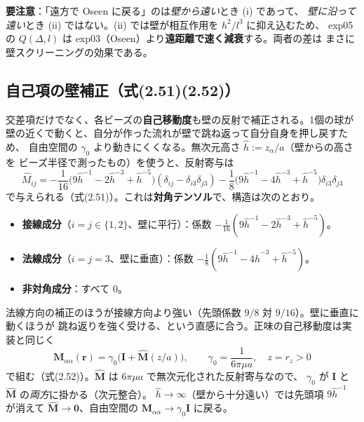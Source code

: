 \documentclass[11pt,a4paper]{article}
\newcommand{\rv}{\bm{r}}
\newcommand{\gamz}{\gamma_{0}}
\begin{document}
\begin{warnbox}
\textbf{要注意}：「遠方で Oseen に戻る」のは\emph{壁から遠い}とき (i) であって、
\emph{壁に沿って遠い}とき (ii) ではない。(ii) では壁が相互作用を $h^2/l^3$ に抑え込むため、
exp05 の $Q(\Delta,l)$ は exp03（Oseen）より\textbf{遠距離で速く減衰}する。両者の差は
まさに壁スクリーニングの効果である。
\end{warnbox}

\subsection{自己項の壁補正（式(2.51)(2.52)）}\label{sec:blakeself}

交差項だけでなく、各ビーズの\textbf{自己移動度}も壁の反射で補正される。1個の球が
壁の近くで動くと、自分が作った流れが壁で跳ね返って自分自身を押し戻すため、
自由空間の $\gamz$ より動きにくくなる。無次元高さ $\hat h:=z_\alpha/a$（壁からの高さを
ビーズ半径で測ったもの）を使うと、反射寄与は
\begin{equation}
\widehat M_{ij}=-\frac{1}{16}\big(9\hat h^{-1}-2\hat h^{-3}+\hat h^{-5}\big)
(\delta_{ij}-\delta_{i3}\delta_{j3})
-\frac{1}{8}\big(9\hat h^{-1}-4\hat h^{-3}+\hat h^{-5}\big)\delta_{i3}\delta_{j3}
\end{equation}
で与えられる（式(2.51)）。これは\textbf{対角テンソル}で、構造は次のとおり。
\begin{itemize}\setlength{\itemsep}{1pt}
\item \textbf{接線成分}（$i=j\in\{1,2\}$、壁に平行）：係数 $-\tfrac{1}{16}(9\hat h^{-1}-2\hat h^{-3}+\hat h^{-5})$。
\item \textbf{法線成分}（$i=j=3$、壁に垂直）：係数 $-\tfrac{1}{8}(9\hat h^{-1}-4\hat h^{-3}+\hat h^{-5})$。
\item \textbf{非対角成分}：すべて $0$。
\end{itemize}
法線方向の補正のほうが接線方向より強い（先頭係数 $9/8$ 対 $9/16$）。壁に垂直に動くほうが
跳ね返りを強く受ける、という直感に合う。正味の自己移動度は実装と同じく
\begin{equation}
\bm M_{\alpha\alpha}(\rv)=\gamz\big(\bm I+\widehat{\bm M}(z/a)\big),\qquad
\gamz=\frac{1}{6\pi\mu a},\quad z=r_z>0
\end{equation}
で組む（式(2.52)）。$\widehat{\bm M}$ は $6\pi\mu a$ で無次元化された反射寄与なので、
$\gamz$ が $\bm I$ と $\widehat{\bm M}$ の\emph{両方}に掛かる（次元整合）。
$\hat h\to\infty$（壁から十分遠い）では先頭項 $9\hat h^{-1}$ が消えて
$\widehat{\bm M}\to\bm 0$、自由空間の $\bm M_{\alpha\alpha}\to\gamz\bm I$ に戻る。
\end{document}
